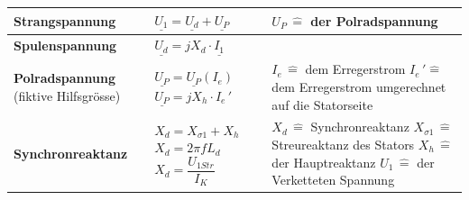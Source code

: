     \begin{longtable}[b]{| C{5cm}| P{8.5cm} | P{5 cm} |}
    	\hline
        \textbf{Strangspannung} 	&
        $\underline{U_1\!} = \underline{U_d\!} + \underline{U_P\!}$ &
        $U_P \, \widehat{=}$ der Polradspannung
        \\ \hline
        
        \textbf{Spulenspannung}	&
        $\underline{U_d} = jX_d\cdot \underline{I_1}$ &
        \\ \hline
        
        \textbf{Polradspannung} \newline (fiktive Hilfsgrösse) &
        $\underline{U_P} = \underline{U_P}\left(I_e\right)$ \newline\newline
        $\underline{U_P} = jX_h\cdot I_{e}\,'$  &
        $I_e \, \widehat{=}$ dem Erregerstrom \newline
        $I_e \,' \widehat{=}$ dem Erregerstrom umgerechnet auf die Statorseite
        \\ \hline
        
        \textbf{Synchronreaktanz} &
        $X_d = X_{\sigma 1} + X_h$ \newline \newline 
        $X_d = 2\pi f L_d$ \newline \newline
        $X_d = \dfrac{U_{1Str}}{I_K}$&
        $X_d \, \widehat{=} $ Synchronreaktanz \newline
        $X_{\sigma 1} \, \widehat{=}$ Streureaktanz des Stators \newline
        $X_h \, \widehat{=}$ der Hauptreaktanz \newline 
        $U_1\, \widehat{=}$ der Verketteten Spannung
        \\ \hline
        

\end{longtable}

